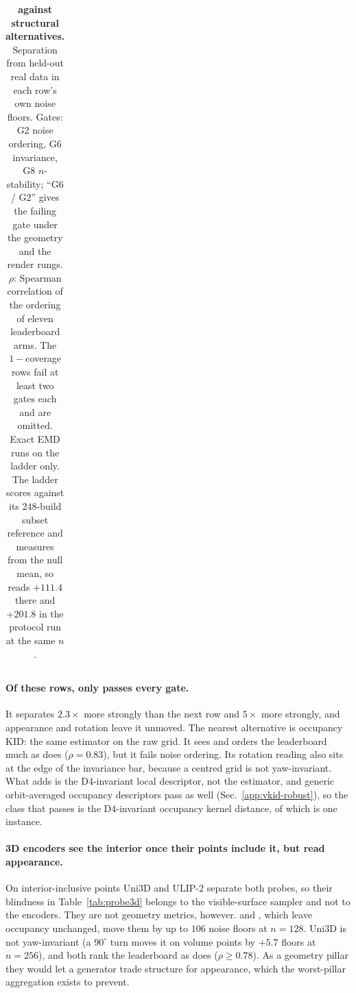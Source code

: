\begin{table}[h]
{\begin{tabular}{lrrrrlrrr}
\bottomrule
\end{tabular}}
\caption{\textbf{\vkid{} against structural alternatives.} Separation from held-out real
data in each row's own noise floors. Gates: G2 noise ordering, G6 invariance, G8
$n$-stability; ``G6 / G2'' gives the failing gate under the geometry and the render rungs.
$\rho$: Spearman correlation of the ordering of eleven leaderboard arms. The $1-$coverage
rows fail at least two gates each and are omitted. Exact EMD runs on the ladder only. The
ladder scores against its $248$-build subset reference and measures from the null mean, so \vkid{} reads $+111.4$ there
and $+201.8$ in the protocol run at the same $n$.}
\label{tab:headtohead}
\end{table}

\paragraph{Of these rows, only \vkid{} passes every gate.} It separates \solidify{} $2.3\times$ more
strongly than the next row and \hollow{} $5\times$ more strongly, and appearance and
rotation leave it unmoved. The nearest alternative is occupancy KID: the same estimator on
the raw grid. It sees \solidify{} and orders the leaderboard much as \vkid{} does
($\rho{=}0.83$), but it fails noise ordering. Its rotation reading also sits at the edge of
the invariance bar, because a centred grid is not yaw-invariant. What \vkid{} adds is the
D4-invariant local descriptor, not the estimator, and generic orbit-averaged occupancy
descriptors pass as well (Sec.~\ref{app:vkid-robust}), so the class that passes is the
D4-invariant occupancy kernel distance, of which \vkid{} is one instance.

\paragraph{3D encoders see the interior once their points include it, but read
appearance.} On interior-inclusive points Uni3D and ULIP-2 separate both probes, so their
blindness in Table~\ref{tab:probe3d} belongs to the visible-surface sampler and not to the
encoders. They are not geometry metrics, however. \matshuffle{} and \monochrome{}, which
leave occupancy unchanged, move them by up to $106$ noise floors at $n{=}128$. Uni3D is
not yaw-invariant (a $90^\circ$ turn moves it on volume points by $+5.7$ floors at
$n{=}256$), and both rank the
leaderboard as \mvkid{} does ($\rho \ge 0.78$). As a geometry pillar they would let a
generator trade structure for appearance, which the worst-pillar aggregation exists to
prevent.

